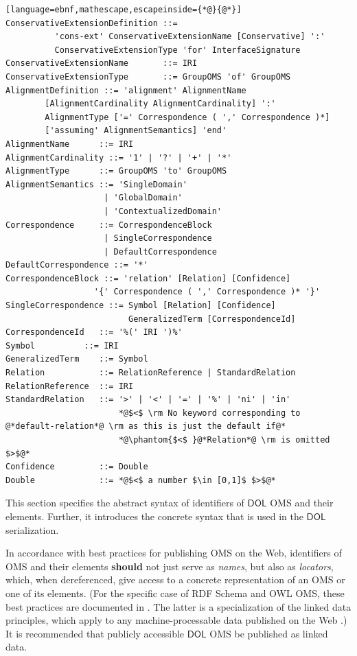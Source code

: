 \documentclass[10pt, a4paper]{isov2}
\makeatletter
\newcommand*\CommentAuthor{}
\renewcommand*\CommentAuthor{#1}}
\newcommand*\CommentDate{}
\renewcommand*\CommentDate{#1}}
\newcommand*\CommentId{}
\renewcommand*\CommentId{#1}}
\newcommand*\CommentType{}
\renewcommand*\CommentType{#1}}
\newcommand*{\SetCommentColorByType}[1]{%
\edef\localType{{#1}}%
\expandafter\ifstrequal\localType{q-aut}{\colorlet{CommentColor}{red}}{%
\expandafter\ifstrequal\localType{q-all}{\colorlet{CommentColor}{orange}}{%
\expandafter\ifstrequal\localType{todo}{\colorlet{CommentColor}{orange}}{%
\expandafter\ifstrequal\localType{fyi}{\colorlet{CommentColor}{lightgray}}{%
\colorlet{CommentColor}{yellow}}}}}}
\newcommand*{\SetCommentPrefixByType}[1]{%
\edef\localType{{#1}}%
\expandafter\@ifmtarg\localType{%
\edef\CommentPrefix{}%
}{%
\caseupper[q]{#1}%
\edef\CommentPrefix{\thestring: }%
}}
\newcommand*{\initComment}[1]{%
\setkeys{Comment}{#1}%
\SetCommentColorByType{\CommentType}%
\relax%
\SetCommentPrefixByType{\CommentType}%
\relax%
}
\newcommand*{\todonote}[2][]{%
\initComment{#1}%
\pdfcomment[author=\CommentAuthor,color=CommentColor,date=\CommentDate,id=\CommentId]{%
\CommentPrefix
#2}}
\renewcommand*{\todonote}[2][]{%
\initComment{#1}%
\ednote{\CommentPrefix #2}}
\newcommand*{\CLnote}[2][author=Christoph Lange]{%
\todonote[author=Christoph Lange,#1]{#2}}
\newcommand*{\should}{\textbf{should}\xspace}
\newcommand*{\DOL}{\ensuremath{\mathsf{DOL}}\xspace}
\makeatother
\begin{document}
\begin{lstlisting}[language=ebnf,mathescape,escapeinside={*@}{@*}]
ConservativeExtensionDefinition ::= 
          'cons-ext' ConservativeExtensionName [Conservative] ':'
          ConservativeExtensionType 'for' InterfaceSignature
ConservativeExtensionName       ::= IRI
ConservativeExtensionType       ::= GroupOMS 'of' GroupOMS
AlignmentDefinition ::= 'alignment' AlignmentName
        [AlignmentCardinality AlignmentCardinality] ':'
        AlignmentType ['=' Correspondence ( ',' Correspondence )*]
        ['assuming' AlignmentSemantics] 'end'
AlignmentName      ::= IRI
AlignmentCardinality ::= '1' | '?' | '+' | '*'
AlignmentType      ::= GroupOMS 'to' GroupOMS
AlignmentSemantics ::= 'SingleDomain'
                    | 'GlobalDomain'
                    | 'ContextualizedDomain'
Correspondence     ::= CorrespondenceBlock 
                    | SingleCorrespondence 
                    | DefaultCorrespondence
DefaultCorrespondence ::= '*'
CorrespondenceBlock ::= 'relation' [Relation] [Confidence] 
                  '{' Correspondence ( ',' Correspondence )* '}'
SingleCorrespondence ::= Symbol [Relation] [Confidence]
                         GeneralizedTerm [CorrespondenceId]
CorrespondenceId   ::= '%(' IRI ')%'
Symbol          ::= IRI
GeneralizedTerm    ::= Symbol
Relation           ::= RelationReference | StandardRelation
RelationReference  ::= IRI
StandardRelation   ::= '>' | '<' | '=' | '%' | 'ni' | 'in'
                       *@$<$ \rm No keyword corresponding to @*default-relation*@ \rm as this is just the default if@*
                       *@\phantom{$<$ }@*Relation*@ \rm is omitted $>$@*
Confidence         ::= Double
Double             ::= *@$<$ a number $\in [0,1]$ $>$@*
\end{lstlisting}




\label{c:identifiers}
This section specifies the abstract syntax of identifiers of \DOL OMS and their elements. Further,
it introduces the concrete syntax that is used in the \DOL serialization.
\label{c:iris}


In accordance with best practices for publishing OMS on the Web, identifiers of OMS and their
elements \should not just serve as \emph{names}, but also as \emph{locators}, which, when
dereferenced, give access to a concrete representation of an OMS or one of its elements.  (For the
specific case of RDF Schema and OWL OMS, these best practices are documented in
\cite{W3C:swbp-vocab-pub}.  The latter is a specialization of the linked data
principles, which apply to any machine-processable data published on the Web
\cite{BernersLee:LinkedData2006}.)  It is recommended that publicly accessible \DOL OMS be published
as linked data.
\end{document}
